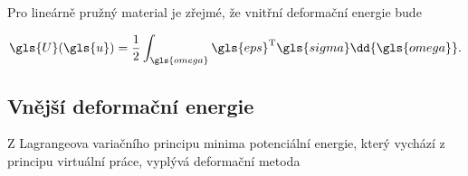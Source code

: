 Pro lineárně pružný material je zřejmé, že vnitřní deformační energie bude

\begin{equation}
    \gls{U}(\gls{u}) = \frac{1}{2} \int_{\gls{omega}} {\gls{eps}}^\mathrm{T} \gls{sigma} \dd{\gls{omega}}.
\end{equation}

\subsection{Vnější deformační energie}

Z Lagrangeova variačního principu minima potenciální energie, který vychází z principu virtuální práce, vyplývá deformační metoda

